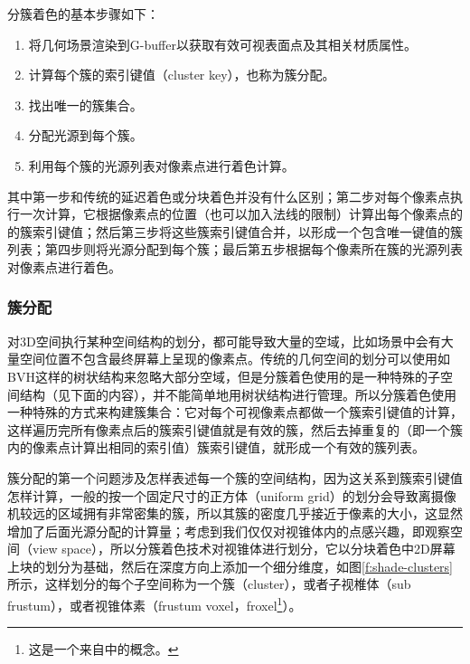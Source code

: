 分簇着色的基本步骤如下：

\begin{enumerate}
	\item 将几何场景渲染到G-buffer以获取有效可视表面点及其相关材质属性。
	\item 计算每个簇的索引键值（cluster key），也称为簇分配。
	\item 找出唯一的簇集合。
	\item 分配光源到每个簇。
	\item 利用每个簇的光源列表对像素点进行着色计算。
\end{enumerate}

其中第一步和传统的延迟着色或分块着色并没有什么区别；第二步对每个像素点执行一次计算，它根据像素点的位置（也可以加入法线的限制）计算出每个像素点的的簇索引键值；然后第三步将这些簇索引键值合并，以形成一个包含唯一键值的簇列表；第四步则将光源分配到每个簇；最后第五步根据每个像素所在簇的光源列表对像素点进行着色。





\subsubsection{簇分配}
对3D空间执行某种空间结构的划分，都可能导致大量的空域，比如场景中会有大量空间位置不包含最终屏幕上呈现的像素点。传统的几何空间的划分可以使用如BVH这样的树状结构来忽略大部分空域，但是分簇着色使用的是一种特殊的子空间结构（见下面的内容），并不能简单地用树状结构进行管理。所以分簇着色使用一种特殊的方式来构建簇集合：它对每个可视像素点都做一个簇索引键值的计算，这样遍历完所有像素点后的簇索引键值就是有效的簇，然后去掉重复的（即一个簇内的像素点计算出相同的索引值）簇索引键值，就形成一个有效的簇列表。

簇分配的第一个问题涉及怎样表述每一个簇的空间结构，因为这关系到簇索引键值怎样计算，一般的按一个固定尺寸的正方体（uniform grid）的划分会导致离摄像机较远的区域拥有非常密集的簇，所以其簇的密度几乎接近于像素的大小，这显然增加了后面光源分配的计算量；考虑到我们仅仅对视锥体内的点感兴趣，即观察空间（view space），所以分簇着色技术对视锥体进行划分，它以分块着色中2D屏幕上块的划分为基础，然后在深度方向上添加一个细分维度，如图\ref{f:shade-clusters}所示，这样划分的每个子空间称为一个簇（cluster），或者子视椎体（sub frustum），或者视锥体素（frustum voxel，froxel\footnote{这是一个来自\cite{a:Learningfromfailure}中的概念。}）。

